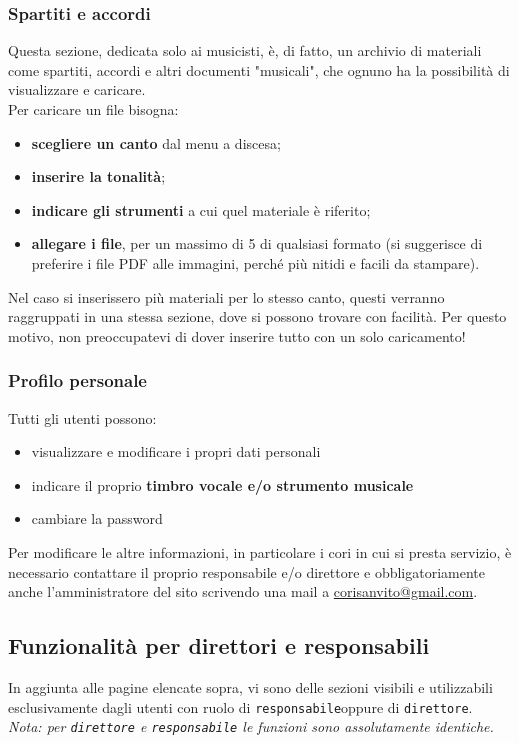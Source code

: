 \documentclass[a4paper,12pt]{article}
\newcommand{\roledirettore}{\texttt{direttore}}
\newcommand{\roleresponsabile}{\texttt{responsabile}}
\begin{document}
	\subsubsection{Spartiti e accordi}
	Questa sezione, dedicata solo ai musicisti, è, di fatto, un archivio di materiali come spartiti, accordi e altri documenti "musicali", che ognuno ha la possibilità di visualizzare e caricare.\\
	Per caricare un file bisogna:
	\begin{itemize}
		\item \textbf{scegliere un canto} dal menu a discesa;
		\item \textbf{inserire la tonalità};
		\item \textbf{indicare gli strumenti} a cui quel materiale è riferito;
		\item \textbf{allegare i file}, per un massimo di 5 di qualsiasi formato (si suggerisce di preferire i file PDF alle immagini, perché più nitidi e facili da stampare).
	\end{itemize}
	
	Nel caso si inserissero più materiali per lo stesso canto, questi verranno raggruppati in una stessa sezione, dove si possono trovare con facilità. Per questo motivo, non preoccupatevi di dover inserire tutto con un solo caricamento!
	
	\subsubsection{Profilo personale}
	Tutti gli utenti possono:
	\begin{itemize}
		\item visualizzare e modificare i propri dati personali
		\item indicare il proprio \textbf{timbro  vocale e/o strumento musicale}
		\item cambiare la password
	\end{itemize}
	Per modificare le altre informazioni, in particolare i cori in cui si presta servizio, è necessario contattare il proprio responsabile e/o direttore e obbligatoriamente anche l'amministratore del sito scrivendo una mail a \href{mailto:corisanvito@gmail.com}{corisanvito@gmail.com}.
	
	
	\subsection{Funzionalità per direttori e responsabili}
	In aggiunta alle pagine elencate sopra, vi sono delle sezioni visibili e utilizzabili esclusivamente dagli utenti con ruolo di \roleresponsabile \space oppure di \roledirettore. \\
	\textit{Nota: per \roledirettore{} e \roleresponsabile{} le funzioni sono assolutamente identiche.}
	
\end{document}
